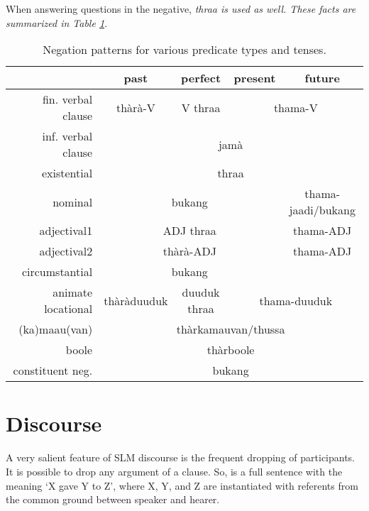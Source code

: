 When answering questions in the negative, \em thraa \em is used as well. These facts are summarized in Table \ref{tab:negation}.


\begin{table}
\begin{center}
\begin{tabular}{r|c|c|c|c|}
 & past & perfect & present & future \\\hline
\hline 
fin. verbal clause & thàrà-V & V thraa &  \multicolumn{2}{|c|}{thama-V}  \\\hline
inf. verbal clause &  \multicolumn{4}{|c|}{jamà}  \\\hline
existential & \multicolumn{4}{|c|}{thraa}  \\\hline
nominal &  \multicolumn{3}{|c|}{bukang} & thama-jaadi/bukang \\\hline
adjectival1 &  \multicolumn{3}{|c|}{ADJ thraa} & thama-ADJ \\\hline
adjectival2 &  \multicolumn{3}{|c|}{thàrà-ADJ} & thama-ADJ \\\hline
circumstantial &  \multicolumn{3}{|c|}{bukang} &  \\\hline
animate locational & thàràduuduk & duuduk thraa & \multicolumn{2}{|c|}{thama-duuduk}\\\hline
~(ka)maau(van) & \multicolumn{4}{|c|}{thàrkamauvan/thussa}  \\\hline
~boole & \multicolumn{4}{|c|}{thàrboole}   \\ \hline
\hline
 constituent neg.  &  \multicolumn{4}{|c|}{bukang} \\
\hline
\end{tabular}
\end{center}
\caption[Negation patterns for various predicate types and tenses]{Negation patterns for various predicate types and tenses.}
\label{tab:negation}
\end{table}

\section{Discourse}
A very salient feature of SLM discourse is the frequent dropping of participants. It is possible to drop any argument of a clause. So,  is a full sentence with the meaning `X gave Y to Z', where X, Y, and Z are instantiated with referents from the common ground between speaker and hearer.


